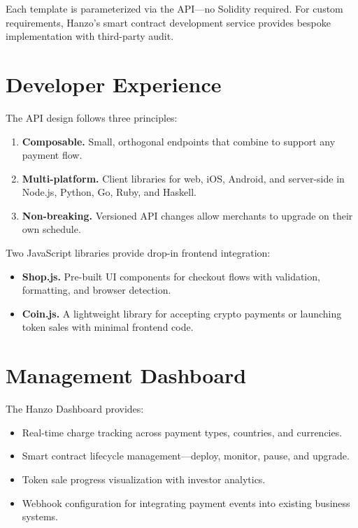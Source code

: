 \documentclass[11pt,twocolumn]{article}
\begin{document}
Each template is parameterized via the API---no Solidity required. For custom
requirements, Hanzo's smart contract development service provides bespoke
implementation with third-party audit.

\section{Developer Experience}
\label{sec:dx}

The API design follows three principles:

\begin{enumerate}[leftmargin=1.1em]
    \item \textbf{Composable.} Small, orthogonal endpoints that combine to
    support any payment flow.
    \item \textbf{Multi-platform.} Client libraries for web, iOS, Android,
    and server-side in Node.js, Python, Go, Ruby, and Haskell.
    \item \textbf{Non-breaking.} Versioned API changes allow merchants to
    upgrade on their own schedule.
\end{enumerate}

Two JavaScript libraries provide drop-in frontend integration:

\begin{itemize}[leftmargin=1.1em]
    \item \textbf{Shop.js.} Pre-built UI components for checkout flows with
    validation, formatting, and browser detection.
    \item \textbf{Coin.js.} A lightweight library for accepting crypto payments
    or launching token sales with minimal frontend code.
\end{itemize}

\section{Management Dashboard}
\label{sec:dashboard}

The Hanzo Dashboard provides:

\begin{itemize}[leftmargin=1.1em]
    \item Real-time charge tracking across payment types, countries, and
    currencies.
    \item Smart contract lifecycle management---deploy, monitor, pause, and
    upgrade.
    \item Token sale progress visualization with investor analytics.
    \item Webhook configuration for integrating payment events into existing
    business systems.
\end{itemize}
\end{document}
